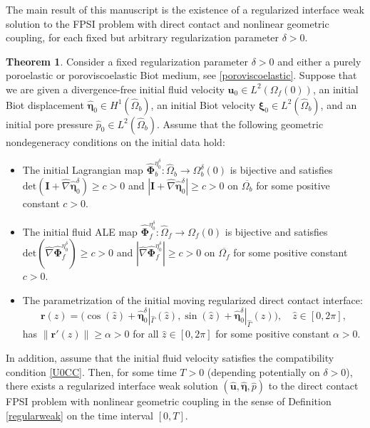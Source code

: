 \documentclass[11pt]{article}
\newcommand{\bd}{\boldsymbol}
\theoremstyle{definition}
\newtheorem{theorem}{Theorem}[section]
\begin{document}
The main result of this manuscript is the existence of a regularized interface weak solution to the FPSI problem with direct contact and nonlinear geometric coupling, for each fixed but arbitrary regularization parameter $\delta > 0$.

\begin{theorem}\label{mainthm}
Consider a fixed regularization parameter $\delta > 0$ and either a purely poroelastic or poroviscoelastic Biot medium, see \eqref{poroviscoelastic}. Suppose that we are given a divergence-free initial fluid velocity $\bd{u}_{0} \in L^{2}(\Omega_{f}(0))$, an initial Biot displacement $\hat{\bd{\eta}}_{0} \in H^{1}(\hat{\Omega}_{b})$, an initial Biot velocity $\hat{\bd{\xi}}_{0} \in L^{2}(\hat{\Omega}_{b})$, and an initial pore pressure $\hat{p}_{0} \in L^{2}(\hat{\Omega}_{b})$. Assume that the following geometric nondegeneracy conditions on the initial data hold:
\begin{itemize}
\item The initial Lagrangian map $\hat{\bd{\Phi}}^{\eta^{\delta}_{0}}_{b}: \hat{\Omega}_{b} \to \Omega^{\delta}_{b}(0)$ is bijective and satisfies $\text{det}(\bd{I} + \hat{\nabla} \hat{\bd{\eta}}_{0}^{\delta}) \ge c > 0$ and $|\bd{I} + \hat{\nabla} \hat{\bd{\eta}}^{\delta}_{0}| \ge c > 0$ on $\overline{\Omega_{b}}$ for some positive constant $c > 0$.
\item The initial fluid ALE map $\hat{\bd{\Phi}}^{\eta^{\delta}_{0}}_{f}: \hat{\Omega}_{f} \to \Omega_{f}(0)$ is bijective and satisfies $\text{det}(\hat{\nabla} \hat{\bd{\Phi}}^{\eta^{\delta}_{0}}_{f}) \ge c > 0$ and $|\hat{\nabla} \hat{\bd{\Phi}}^{\eta^{\delta}_{0}}_{f}| \ge c > 0$ on $\overline{\Omega_{f}}$ for some positive constant $c > 0$. 
\item The parametrization of the initial moving regularized direct contact interface:
\begin{equation*}
\bd{r}(\hat{z}) = \Big(\cos(\hat{z}) + \hat{\bd{\eta}}^{\delta}_{0}|_{\hat{\Gamma}}(\hat{z}), \sin(\hat{z}) + \hat{\bd{\eta}}^{\delta}_{0}|_{\hat{\Gamma}}(\hat{z})\Big), \quad \hat{z} \in [0, 2\pi],
\end{equation*}
has $\|\bd{r}'(\hat{z})\| \ge \alpha > 0$ for all $\hat{z} \in [0, 2\pi]$ for some positive constant $\alpha > 0$. 
\end{itemize}
In addition, assume that the initial fluid velocity satisfies the compatibility condition \eqref{U0CC}. Then, for some time $T > 0$ (depending potentially on $\delta > 0$), there exists a regularized interface weak solution $(\hat{\bd{u}}, \hat{\bd{\eta}}, \hat{p})$ to the direct contact FPSI problem with nonlinear geometric coupling in the sense of Definition \ref{regularweak} on the time interval $[0, T]$.
\end{theorem}
\end{document}

